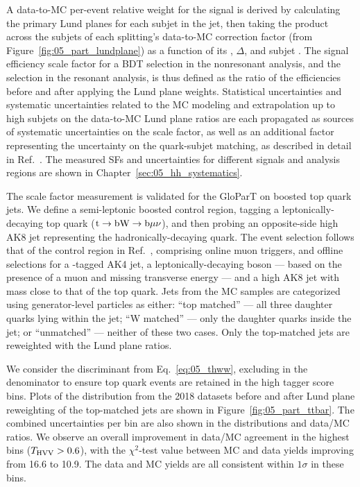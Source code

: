 A data-to-MC per-event relative weight for the signal is derived by calculating the primary Lund planes for each subjet in the \hvv jet, then taking the product across the subjets of each splitting's data-to-MC correction factor (from Figure~\ref{fig:05_part_lundplane}) as a function of its \kt, $\Delta$, and subjet \pt.
The signal efficiency scale factor for a BDT selection in the nonresonant analysis, and the \THWW selection in the resonant analysis, is thus defined as the ratio of the efficiencies before and after applying the Lund plane weights.
Statistical uncertainties and systematic uncertainties related to the MC modeling and extrapolation up to high \pt subjets on the data-to-MC Lund plane ratios are each propagated as sources of systematic uncertainties on the scale factor, as well as an additional factor representing the uncertainty on the quark-subjet matching, as described in detail in Ref.~\cite{CMS-DP-2023-046}.
The measured SFs and uncertainties for different signals and analysis regions are shown in Chapter~\ref{sec:05_hh_systematics}.

The scale factor measurement is validated for the GloParT on boosted top quark jets.
We define a semi-leptonic boosted \ttbar control region, tagging a leptonically-decaying top quark ($\textrm{t}\to\textrm{b}\textrm{W}\to\textrm{b}\mu\nu$), and then probing an opposite-side high \pt AK8 jet representing the hadronically-decaying quark.
The event selection follows that of the control region in Ref.~\cite{CMS-DP-2023-046}, comprising online muon triggers, and offline selections for a \PQb-tagged AK4 jet, a leptonically-decaying \PW boson --- based on the presence of a muon and missing transverse energy --- and a high \pt AK8 jet with mass close to that of the top quark.
Jets from the \ttbar MC samples are categorized using generator-level particles as either: ``top matched'' --- all three daughter quarks lying within the jet; ``W matched'' --- only the \PW daughter quarks inside the jet; or ``unmatched'' --- neither of these two cases.
Only the top-matched jets are reweighted with the Lund plane ratios.

We consider the \THWW discriminant from Eq.~\ref{eq:05_thww}, excluding \PTop in the denominator to ensure top quark events are retained in the high tagger score bins.
Plots of the \THWW distribution from the 2018 datasets before and after Lund plane reweighting of the top-matched jets are shown in Figure~\ref{fig:05_part_ttbar}.
The combined uncertainties per bin are also shown in the distributions and data/MC ratios.
We observe an overall improvement in data/MC agreement in the highest \THWW bins ($T_{\mathrm{HVV}} > 0.6$), with the $\chi^2$-test value between MC and data yields improving from 16.6 to 10.9.
The data and MC yields are all consistent within $1\sigma$ in these bins.

